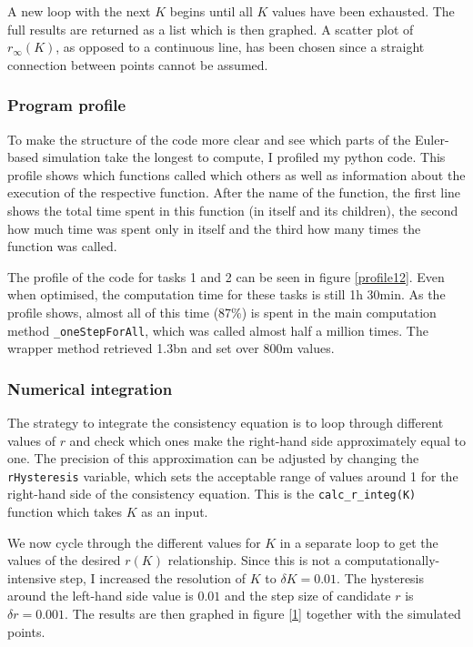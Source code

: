 \documentclass[11pt,a4paper]{article}
\newcommand{\graph}{\medskip\noindent}
\newcommand{\code}[1]{\texttt{#1}}
\begin{document}
A new loop with the next $K$ begins until all $K$ values have been exhausted. 
The full results are returned as a list which is then graphed.
A scatter plot of $r_\infty(K)$, as opposed to a continuous line, has been chosen since a straight connection between points cannot be assumed.





\subsubsection{Program profile}
To make the structure of the code more clear and see which parts of the Euler-based simulation take the longest to compute, I profiled my python code. 
This profile shows which functions called which others as well as information about the execution of the respective function. 
After the name of the function, the first line shows the total time spent in this function (in itself and its children), the second how much time was spent only in itself and the third how many times the function was called.

\graph
The profile of the code for tasks 1 and 2 can be seen in figure \ref{profile12}.
Even when optimised, the computation time for these tasks is still 1h 30min. 
As the profile shows, almost all of this time (87\%) is spent in the main computation method \code{\_oneStepForAll}, which was called almost half a million times. 
The wrapper method retrieved 1.3bn and set over 800m values.






\subsubsection{Numerical integration}
The strategy to integrate the consistency equation is to loop through different values of $r$ and check which ones make the right-hand side approximately equal to one. 
The precision of this approximation can be adjusted by changing the \code{rHysteresis} variable, which sets the acceptable range of values around 1 for the right-hand side of the consistency equation.
This is the \code{calc\_r\_integ(K)} function which takes $K$ as an input.

We now cycle through the different values for $K$ in a separate loop to get the values of the desired $r(K)$ relationship.
Since this is not a computationally-intensive step, I increased the resolution of $K$ to $\delta K = 0.01$. 
The hysteresis around the left-hand side value is $0.01$ and the step size of candidate $r$ is $\delta r = 0.001$.
The results are then graphed in figure \ref{1} together with the simulated points.
\end{document}
